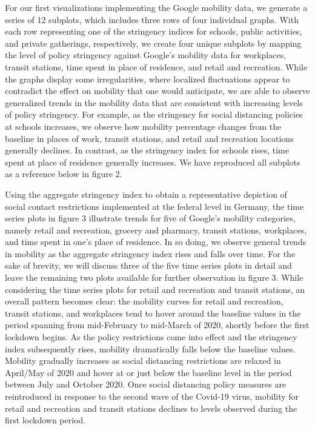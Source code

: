 For our first visualizations implementing the Google mobility data, we generate a series of 12 subplots, which includes three rows of four individual graphs. With each row representing one of the stringency indices for schools, public activities, and private gatherings, respectively, we create four unique subplots by mapping the level of policy stringency against Google’s mobility data for workplaces, transit stations, time spent in place of residence, and retail and recreation. While the graphs display some irregularities, where localized fluctuations appear to contradict the effect on mobility that one would anticipate, we are able to observe generalized trends in the mobility data that are consistent with increasing levels of policy stringency. For example, as the stringency for social distancing policies at schools increases, we observe how mobility percentage changes from the baseline in places of work, transit stations, and retail and recreation locations generally declines. In contrast, as the stringency index for schools rises, time spent at place of residence generally increases. We have reproduced all subplots as a reference below in figure 2.

Using the aggregate stringency index to obtain a representative depiction of social contact restrictions implemented at the federal level in Germany, the time series plots in figure 3 illustrate trends for five of Google’s mobility categories, namely retail and recreation, grocery and pharmacy, transit stations, workplaces, and time spent in one’s place of residence. In so doing, we observe general trends in mobility as the aggregate stringency index rises and falls over time. For the sake of brevity, we will discuss three of the five time series plots in detail and leave the remaining two plots available for further observation in figure 3. While considering the time series plots for retail and recreation and transit stations, an overall pattern becomes clear: the mobility curves for retail and recreation, transit stations, and workplaces tend to hover around the baseline values in the period spanning from mid-February to mid-March of 2020, shortly before the first lockdown begins. As the policy restrictions come into effect and the stringency index subsequently rises, mobility dramatically falls below the baseline values. Mobility gradually increases as social distancing restrictions are relaxed in April/May of 2020 and hover at or just below the baseline level in the period between July and October 2020. Once social distancing policy measures are reintroduced in response to the second wave of the Covid-19 virus, mobility for retail and recreation and transit stations declines to levels observed during the first lockdown period.

